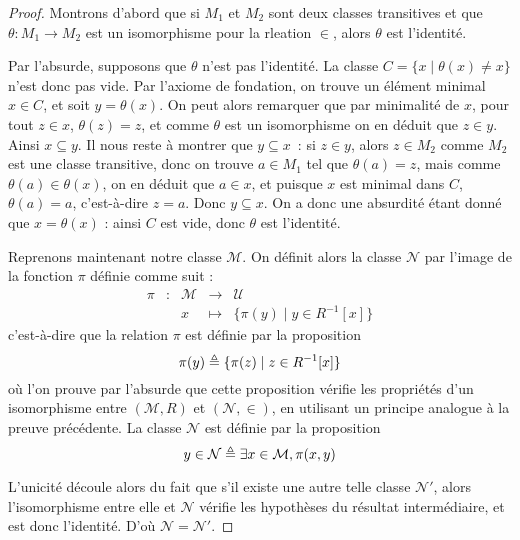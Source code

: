 \begin{proof}
  Montrons d'abord que si $M_1$ et $M_2$ sont deux classes transitives et que
  $\theta : M_1\to M_2$ est un isomorphisme pour la rleation $\in$, alors
  $\theta$ est l'identité.

  Par l'absurde, supposons que $\theta$ n'est pas l'identité. La classe
  $C = \{x\mid \theta(x)\neq x\}$ n'est donc pas vide. Par l'axiome de
  fondation, on trouve un élément minimal $x\in C$, et soit $y = \theta(x)$. On
  peut alors remarquer que par minimalité de $x$, pour tout $z\in x$,
  $\theta(z)=z$, et comme $\theta$ est un isomorphisme on en déduit que
  $z\in y$. Ainsi $x\subseteq y$. Il nous reste à montrer que $y\subseteq x$~:
  si $z\in y$, alors $z\in M_2$ comme $M_2$ est une classe transitive, donc on
  trouve $a\in M_1$ tel que $\theta(a)=z$, mais comme $\theta(a)\in \theta(x)$,
  on en déduit que $a\in x$, et puisque $x$ est minimal dans $C$, $\theta(a)=a$,
  c'est-à-dire $z = a$. Donc $y\subseteq x$. On a donc une absurdité étant donné
  que $x = \theta(x)$ : ainsi $C$ est vide, donc $\theta$ est l'identité.

  Reprenons maintenant notre classe $\mathcal M$. On définit alors la classe
  $\mathcal N$ par l'image de la fonction $\pi$ définie comme suit :
  \[\begin{array}{rcccl}
  \pi & : & \mathcal M & \longrightarrow & \mathcal U\\
  & & x & \longmapsto & \{\pi(y)\mid y \in R^{-1}[x]\}
  \end{array}\]
  c'est-à-dire que la relation $\pi$ est définie par la proposition
  \[\pi(y) \triangleq \{\pi(z)\mid z \in R^{-1}[x]\}\]
  où l'on prouve par l'absurde que cette proposition vérifie les propriétés d'un
  isomorphisme entre $(\mathcal M,R)$ et $(\mathcal N,\in)$, en utilisant un
  principe analogue à la preuve précédente. La classe $\mathcal N$ est définie
  par la proposition
  \[y \in \mathcal N \triangleq \exists x\in\mathcal M, \pi(x,y)\]

  L'unicité découle alors du fait que s'il existe une autre telle classe
  $\mathcal N'$, alors l'isomorphisme entre elle et $\mathcal N$ vérifie les
  hypothèses du résultat intermédiaire, et est donc l'identité. D'où
  $\mathcal N = \mathcal N'$.
\end{proof}

